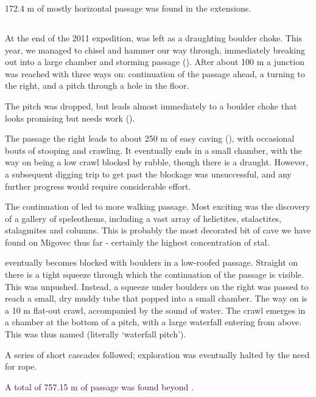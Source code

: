172.4 m of mostly horizontal passage was found in the 
extensions.


\subsection{\texorpdfstring{}{Lost Miles}}

At the end of the 2011 expedition,  was left as a
draughting boulder choke. This year, we managed to chisel and hammer our
way through, immediately breaking out into a large chamber and storming
passage (). After about 100 m a junction was reached with
three ways on: continuation of the passage ahead, a turning to the
right, and a pitch through a hole in the floor.

The pitch was dropped, but leads almost immediately to a boulder choke
that looks promising but needs work ().

The passage the right leads to about 250 m of easy caving (),
with occasional bouts of stooping and crawling. It eventually ends in a
small chamber, with the way on being a low crawl blocked by rubble,
though there is a draught. However, a subsequent digging trip to get
past the blockage was unsuccessful, and any further progress would
require considerable effort.

The continuation of  led to more walking passage. Most
exciting was the discovery of a gallery of speleothems, including a vast
array of helictites, stalactites, stalagmites and columns. This is
probably the most decorated bit of cave we have found on Migovec thus
far - certainly the highest concentration of stal.

 eventually becomes blocked with boulders in a low-roofed
passage. Straight on there is a tight squeeze through which the
continuation of the passage is visible. This was unpushed. Instead, a
squeeze under boulders on the right was passed to reach a small, dry
muddy tube that popped into a small chamber. The way on is a 10 m
flat-out crawl, accompanied by the sound of water. The crawl emerges in
a chamber at the bottom of a pitch, with a large waterfall entering from
above. This was thus named  (literally `waterfall
pitch').

A series of short cascades followed; exploration was eventually halted
by the need for rope.

A total of 757.15 m of passage was found beyond .

